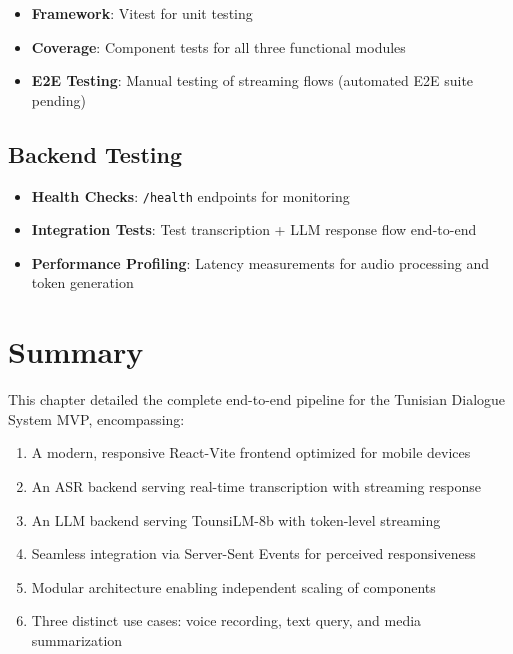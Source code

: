\documentclass[12pt,a4paper]{report}
\begin{document}
\begin{itemize}
    \item \textbf{Framework}: Vitest for unit testing
    \item \textbf{Coverage}: Component tests for all three functional modules
    \item \textbf{E2E Testing}: Manual testing of streaming flows (automated E2E suite pending)
\end{itemize}

\subsection{Backend Testing}

\begin{itemize}
    \item \textbf{Health Checks}: \texttt{/health} endpoints for monitoring
    \item \textbf{Integration Tests}: Test transcription + LLM response flow end-to-end
    \item \textbf{Performance Profiling}: Latency measurements for audio processing and token generation
\end{itemize}

\section{Summary}

This chapter detailed the complete end-to-end pipeline for the Tunisian Dialogue System MVP, encompassing:

\begin{enumerate}
    \item A modern, responsive React-Vite frontend optimized for mobile devices
    \item An ASR backend serving real-time transcription with streaming response
    \item An LLM backend serving TounsiLM-8b with token-level streaming
    \item Seamless integration via Server-Sent Events for perceived responsiveness
    \item Modular architecture enabling independent scaling of components
    \item Three distinct use cases: voice recording, text query, and media summarization
\end{enumerate}
\end{document}
